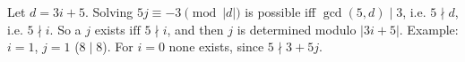 Let $d=3i+5$. Solving $5j\equiv-3\pmod{|d|}$ is possible iff $\gcd(5,d)\mid3$, i.e. $5\nmid d$, i.e. $5\nmid i$. So a $j$ exists $\boxed{\text{iff }5\nmid i}$, and then $j$ is determined modulo $|3i+5|$. Example: $i=1$, $j=1$ ($8\mid8$). For $i=0$ none exists, since $5\nmid3+5j$.

